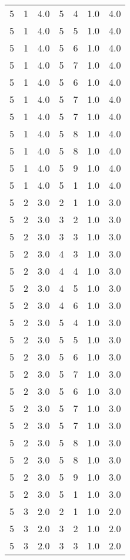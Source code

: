 \documentclass[a4paper,12pt]{article}
\begin{document}
\begin{center}
\begin{longtable}{ c c c | c c c | c }
        5 & 1 & 4.0 & 5 & 4 & 1.0 & 4.0 \\
        5 & 1 & 4.0 & 5 & 5 & 1.0 & 4.0 \\
        5 & 1 & 4.0 & 5 & 6 & 1.0 & 4.0 \\
        5 & 1 & 4.0 & 5 & 7 & 1.0 & 4.0 \\
        5 & 1 & 4.0 & 5 & 6 & 1.0 & 4.0 \\
        5 & 1 & 4.0 & 5 & 7 & 1.0 & 4.0 \\
        5 & 1 & 4.0 & 5 & 7 & 1.0 & 4.0 \\
        5 & 1 & 4.0 & 5 & 8 & 1.0 & 4.0 \\
        5 & 1 & 4.0 & 5 & 8 & 1.0 & 4.0 \\
        5 & 1 & 4.0 & 5 & 9 & 1.0 & 4.0 \\
        5 & 1 & 4.0 & 5 & 1 & 1.0 & 4.0 \\
        5 & 2 & 3.0 & 2 & 1 & 1.0 & 3.0 \\
        5 & 2 & 3.0 & 3 & 2 & 1.0 & 3.0 \\
        5 & 2 & 3.0 & 3 & 3 & 1.0 & 3.0 \\
        5 & 2 & 3.0 & 4 & 3 & 1.0 & 3.0 \\
        5 & 2 & 3.0 & 4 & 4 & 1.0 & 3.0 \\
        5 & 2 & 3.0 & 4 & 5 & 1.0 & 3.0 \\
        5 & 2 & 3.0 & 4 & 6 & 1.0 & 3.0 \\
        5 & 2 & 3.0 & 5 & 4 & 1.0 & 3.0 \\
        5 & 2 & 3.0 & 5 & 5 & 1.0 & 3.0 \\
        5 & 2 & 3.0 & 5 & 6 & 1.0 & 3.0 \\
        5 & 2 & 3.0 & 5 & 7 & 1.0 & 3.0 \\
        5 & 2 & 3.0 & 5 & 6 & 1.0 & 3.0 \\
        5 & 2 & 3.0 & 5 & 7 & 1.0 & 3.0 \\
        5 & 2 & 3.0 & 5 & 7 & 1.0 & 3.0 \\
        5 & 2 & 3.0 & 5 & 8 & 1.0 & 3.0 \\
        5 & 2 & 3.0 & 5 & 8 & 1.0 & 3.0 \\
        5 & 2 & 3.0 & 5 & 9 & 1.0 & 3.0 \\
        5 & 2 & 3.0 & 5 & 1 & 1.0 & 3.0 \\
        5 & 3 & 2.0 & 2 & 1 & 1.0 & 2.0 \\
        5 & 3 & 2.0 & 3 & 2 & 1.0 & 2.0 \\
        5 & 3 & 2.0 & 3 & 3 & 1.0 & 2.0 \\

\end{longtable}
\end{center}
\end{document}
